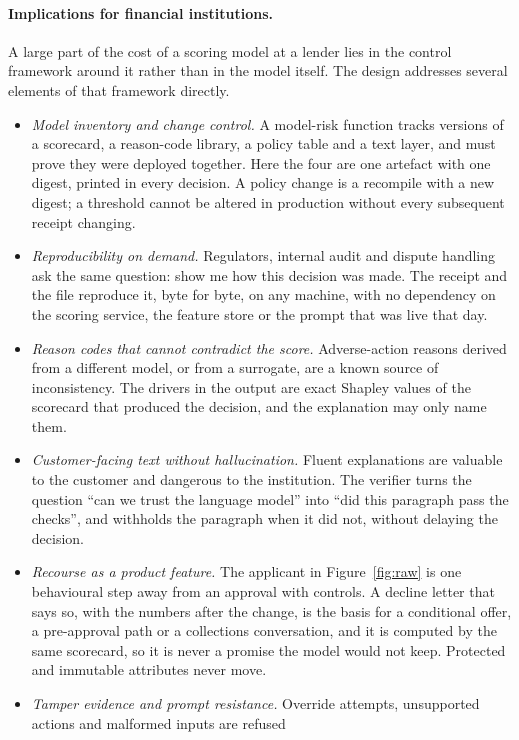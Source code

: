 \documentclass[twocolumn,10pt]{article}
\begin{document}
\paragraph{Implications for financial institutions.} A large part of the cost of a scoring model at a lender lies in the control
framework around it rather than in the model itself. The design addresses several elements of that framework directly.

\begin{itemize}\setlength\itemsep{2pt}
\item \emph{Model inventory and change control.} A model-risk function tracks versions of a scorecard, a reason-code
  library, a policy table and a text layer, and must prove they were deployed together. Here the four are one artefact
  with one digest, printed in every decision. A policy change is a recompile with a new digest; a threshold cannot be
  altered in production without every subsequent receipt changing.
\item \emph{Reproducibility on demand.} Regulators, internal audit and dispute handling ask the same question: show me
  how this decision was made. The receipt and the file reproduce it, byte for byte, on any machine, with no dependency on
  the scoring service, the feature store or the prompt that was live that day.
\item \emph{Reason codes that cannot contradict the score.} Adverse-action reasons derived from a different model, or
  from a surrogate, are a known source of inconsistency. The drivers in the output are exact Shapley values of the
  scorecard that produced the decision, and the explanation may only name them.
\item \emph{Customer-facing text without hallucination.} Fluent explanations are valuable to the customer and dangerous
  to the institution. The verifier turns the question ``can we trust the language model'' into ``did this paragraph pass
  the checks'', and withholds the paragraph when it did not, without delaying the decision.
\item \emph{Recourse as a product feature.} The applicant in Figure~\ref{fig:raw} is one behavioural step away from an
  approval with controls. A decline letter that says so, with the numbers after the change, is the basis for a conditional
  offer, a pre-approval path or a collections conversation, and it is computed by the same scorecard, so it is never a
  promise the model would not keep. Protected and immutable attributes never move.
\item \emph{Tamper evidence and prompt resistance.} Override attempts, unsupported actions and malformed inputs are refused

\end{itemize}
\end{document}
